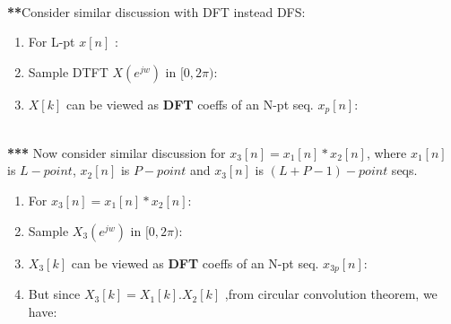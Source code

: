 \documentclass[10pt,a4paper,report]{report}       %
\begin{document}
\-
\vspace{2cm}\\ 

\textbf{**}Consider similar discussion with DFT instead DFS:

\begin{enumerate}
	\item For L-pt $x[n]$ :
	\item Sample DTFT $X(e^{jw})$ in $[0,2\pi)$:
	\item $X[k]$ can be viewed as \textbf{DFT} coeffs of an N-pt seq. $x_p[n]$:
\end{enumerate}

\-
\vspace{2cm}\\


\textbf{***} Now consider similar discussion for $x_3[n]=x_1[n]*x_2[n]$, where $x_1[n]$ is $L-point$, $x_2[n]$ is $P-point$ and $x_3[n]$ is $(L+P-1)-point$ seqs.

\begin{enumerate}
	\item For $x_3[n]=x_1[n]*x_2[n]$:
	\item Sample $X_3(e^{jw})$ in $[0,2\pi)$:
		\vspace{2cm}\\
	\item $X_3[k]$ can be viewed as \textbf{DFT} coeffs of an N-pt seq. $x_{3p}[n]$:
		\vspace{2cm}\\
	\item But since $X_3[k]=X_1[k].X_2[k]$ ,from circular convolution theorem, we have:	
\end{enumerate}

\-
\vspace{2cm}\\
\-
\vspace{2cm}\\
\-
\vspace{2cm}\\
\-
\vspace{2cm}\\
\-
\vspace{2cm}\\








\end{document}
